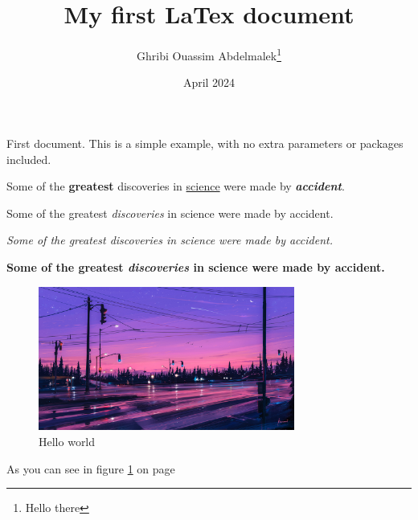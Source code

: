 \documentclass[12pt, a4paper]{article}
\title{My first LaTex document}
\author{Ghribi Ouassim Abdelmalek\thanks{Hello there}}
\date{April 2024}
\begin{document}
\maketitle
First document. This is a simple example, with no
extra parameters or packages included.

Some of the \textbf{greatest}
discoveries in \underline{science}
were made by \textbf{\textit{accident}}.

Some of the greatest \emph{discoveries} in science
were made by accident.

\textit{Some of the greatest \emph{discoveries}
    in science were made by accident.}

\textbf{Some of the greatest \emph{discoveries}
    in science were made by accident.}


\begin{figure}[h]
    \centering
    \includegraphics[width=0.75\textwidth]{alena-aenami-7p-m}
    \caption{Hello world}
    \label{fig:test-1}
\end{figure}

As you can see in figure \ref{fig:test-1} on page \pageref{fig:test-1}
\end{document}
